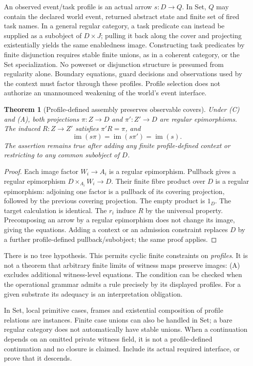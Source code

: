 \documentclass[11pt]{article}
\newtheorem{theorem}{Theorem}\newtheorem{proposition}[theorem]{Proposition}
\begin{document}
An observed event/task profile is an actual arrow $s:D\to Q$. In Set, $Q$ may contain the declared world event, returned abstract state and finite set of fired task names. In a general regular category, a task predicate can instead be supplied as a subobject of $D\times J$; pulling it back along the cover and projecting existentially yields the same enabledness image. Constructing task predicates by finite disjunction requires stable finite unions, as in a coherent category, or the Set specialization. No powerset or disjunction structure is presumed from regularity alone. Boundary equations, guard decisions and observations used by the context must factor through these profiles. Profile selection does not authorize an unannounced weakening of the world's event interface.

\begin{theorem}[Profile-defined assembly preserves observable covers]\label{thm:cover}
Under (C) and (A), both projections $\pi:Z\to D$ and $\pi':Z'\to D$ are regular epimorphisms. The induced $R:Z\to Z'$ satisfies $\pi'R=\pi$, and
\[
 \operatorname{im}(s\pi)=\operatorname{im}(s\pi')=\operatorname{im}(s).
\]
The assertion remains true after adding any finite profile-defined context or restricting to any common subobject of $D$.
\end{theorem}
\begin{proof}
Each image factor $W_i\to A_i$ is a regular epimorphism. Pullback gives a regular epimorphism $D\times_{A_i}W_i\to D$. Their finite fibre product over $D$ is a regular epimorphism: adjoining one factor is a pullback of its covering projection, followed by the previous covering projection. The empty product is $1_D$. The target calculation is identical. The $r_i$ induce $R$ by the universal property. Precomposing an arrow by a regular epimorphism does not change its image, giving the equations. Adding a context or an admission constraint replaces $D$ by a further profile-defined pullback/subobject; the same proof applies.
\end{proof}

There is no tree hypothesis. This permits cyclic finite constraints on \emph{profiles}. It is not a theorem that arbitrary finite limits of witness maps preserve images: (A) excludes additional witness-level equations. The condition can be checked when the operational grammar admits a rule precisely by its displayed profiles. For a given substrate its adequacy is an interpretation obligation.

In Set, local primitive cases, frames and existential composition of profile relations are instances. Finite case unions can also be handled in Set; a bare regular category does not automatically have stable unions. When a continuation depends on an omitted private witness field, it is not a profile-defined continuation and no closure is claimed. Include its actual required interface, or prove that it descends.
\end{document}
